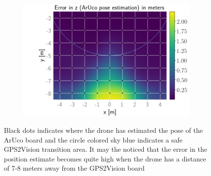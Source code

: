 \documentclass[../Head/report.tex]{subfiles}
\begin{document}
\begin{figure}[H]
    \hspace{-0.9em}
    \begin{subfigure}[t]{.337\textwidth}
        \centering
        \includegraphics[width=\textwidth]{../Figures/GPS2Vision_pose_estimation_test/test1_aruco_board_width_0.2_space_0.1/aruco_pose_estimation_error_z.png}
        \caption{}
        \label{fig:GPS2Vision_pose_estimation_test1_error_z}
    \end{subfigure}
    \caption{Black dots indicates where the drone has estimated the pose of the ArUco board and the circle colored sky blue indicates a safe GPS2Vision transition area. It may the noticed that the error in the position estimate becomes quite high when the drone has a distance of 7-8 meters away from the GPS2Vision board}
    \label{fig:GPS2Vision_pose_estimation_test1_error_pos}
\end{figure}
\end{document}
